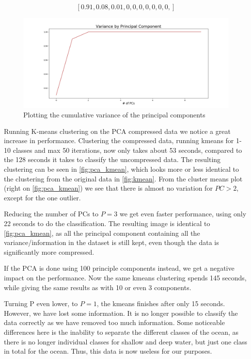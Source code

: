 \begin{equation}
    \label{eq:pca_var}
    [0.91, 0.08, 0.01, 0,   0,   0,   0,   0,   0,   0,  ]
\end{equation}

\begin{figure}
    \centering
    \includegraphics[width=\textwidth]{../fig/pca/variance_cumsum.png}
    \caption{Plotting the cumulative variance of the principal components}
    \label{fig:pca_var}
\end{figure}

Running K-means clustering on the PCA compressed data we notice a great increase in performance. 
Clustering the compressed data, running kmeans for 1-10 classes and max 50 iterations, 
now only takes about 53 seconds, compared to the 128 seconds 
it takes to classify the uncompressed data. The resulting clustering can be seen in 
\cref{fig:pca_kmean}, which looks more or less identical to the clustering from the 
original data in \cref{fig:kmean}. From the cluster means plot (right on \cref{fig:pca_kmean}) 
we see that there is almost no variation for $PC > 2$, except for the one outlier.

Reducing the number of PCs to $P = 3$ we get even faster performance, using only 
22 seconds to do the classification. The resulting image is identical to \cref{fig:pca_kmean}, 
as all the principal component containing all the variance/information in the dataset is still kept, 
even though the data is significantly more compressed. 

If the PCA is done using 100 principle components instead, we get a negative impact on the 
performance. Now the same kmeans clustering spends 145 seconds, while giving the same 
results as with 10 or even 3 components.

Turning P even lower, to $P = 1$, the kmeans finishes after only 15 seconds. However, we 
have lost some information. It is no longer possible to classify the data correctly as we 
have removed too much information. Some noticeable differences here is the inability to 
separate the different classes of the ocean, as there is no longer individual classes for 
shallow and deep water, but just one class in total for the ocean. Thus, this data is now 
useless for our purposes. 


